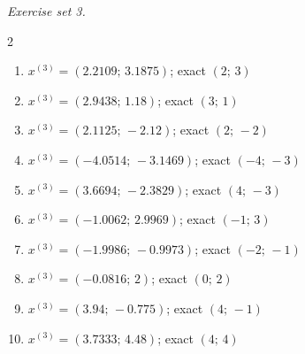\par\noindent\emph{Exercise set 3.}\nopagebreak
\begin{multicols}{2}\raggedright
\begin{enumerate}[label=\arabic*., leftmargin=*, itemsep=1pt]
\item $x^{(3)}=(2.2109;\,3.1875)$; exact $(2;\,3)$
\item $x^{(3)}=(2.9438;\,1.18)$; exact $(3;\,1)$
\item $x^{(3)}=(2.1125;\,-2.12)$; exact $(2;\,-2)$
\item $x^{(3)}=(-4.0514;\,-3.1469)$; exact $(-4;\,-3)$
\item $x^{(3)}=(3.6694;\,-2.3829)$; exact $(4;\,-3)$
\item $x^{(3)}=(-1.0062;\,2.9969)$; exact $(-1;\,3)$
\item $x^{(3)}=(-1.9986;\,-0.9973)$; exact $(-2;\,-1)$
\item $x^{(3)}=(-0.0816;\,2)$; exact $(0;\,2)$
\item $x^{(3)}=(3.94;\,-0.775)$; exact $(4;\,-1)$
\item $x^{(3)}=(3.7333;\,4.48)$; exact $(4;\,4)$
\end{enumerate}
\end{multicols}
